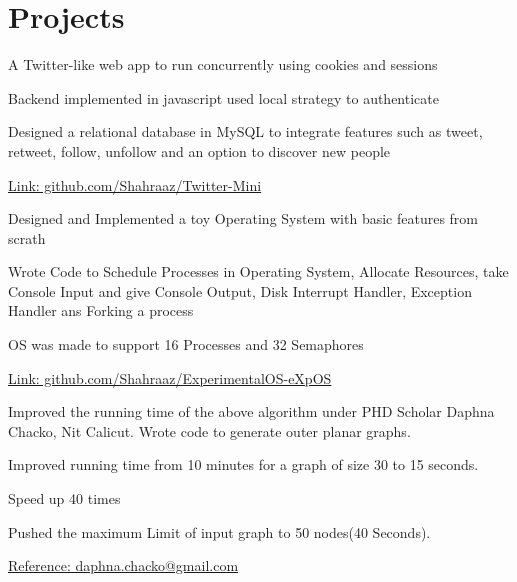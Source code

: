 \documentclass[]{deedy-resume-openfont}
\begin{document}
\hfill
\begin{minipage}[t]{0.66\textwidth} 


\section{Projects}
\vspace{\topsep} %
\begin{tightemize}
\item A Twitter-like web app to run concurrently using cookies and sessions
\item Backend implemented in javascript used local strategy to authenticate 
\item Designed a relational database in MySQL to integrate features such as tweet, retweet, follow, unfollow and an option to discover new people
\item \href{https://github.com/Shahraaz/Twitter-Mini}{Link: github.com/Shahraaz/Twitter-Mini}
\end{tightemize}
\sectionsep

\vspace{\topsep} %
\begin{tightemize}
\item Designed and Implemented a toy Operating System with basic features from scrath
\item Wrote Code to Schedule Processes in Operating System, Allocate Resources, take Console Input and give Console Output, Disk Interrupt Handler, Exception Handler ans Forking a process
\item OS was made to support 16 Processes and 32 Semaphores
\item \href{https://github.com/Shahraaz/ExperimentalOS-eXpOS}{Link: github.com/Shahraaz/ExperimentalOS-eXpOS}
\end{tightemize}
\sectionsep

\vspace{\topsep} %
\begin{tightemize}
\item Improved the running time of the above algorithm under PHD Scholar
Daphna Chacko, Nit Calicut. Wrote code to generate outer planar graphs.
\item Improved running time from 10 minutes for a graph of size 30 to 15
seconds.
\item Speed up 40 times
\item Pushed the maximum Limit of input graph to 50 nodes(40 Seconds).
\item \href{mailto:daphna.chacko@gmail.com}{Reference: daphna.chacko@gmail.com}
\end{tightemize}
\sectionsep


\end{minipage}
\end{document}
